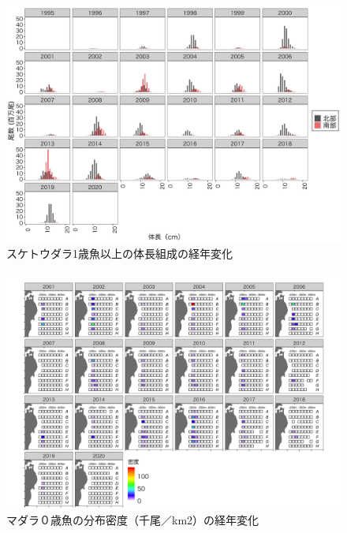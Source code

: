 \documentclass[11pt]{article} %
\begin{document}
\begin{linenumbers}
\begin{figure}[h]
  \centering
  \includegraphics[width = 14cm]{スケトウダラ0+length.png}
  \caption{スケトウダラ1歳魚以上の体長組成の経年変化}
\end{figure}

\begin{figure}[h]
  \centering
  \includegraphics[width = 14cm]{マダラ０＋dens.png}
  \caption{マダラ０歳魚の分布密度（千尾／km2）の経年変化}
\end{figure}


\end{linenumbers}
\end{document}
